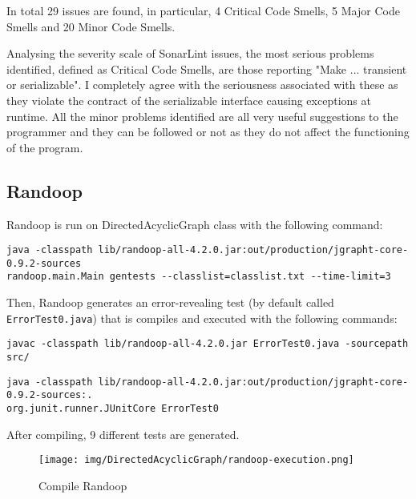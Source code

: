 \documentclass[a4paper,12pt]{article} %
\begin{document}
	In total 29 issues are found, in particular, 4 Critical Code Smells, 5 Major Code Smells and 20 Minor Code Smells.
	
	Analysing  the severity scale of SonarLint issues, the most serious problems identified, defined as Critical Code Smells, are those reporting "Make ... transient or serializable". I completely agree with the seriousness associated with these as they violate the contract of the serializable interface causing exceptions at runtime.
	All the minor problems identified are all very useful suggestions to the programmer and they can be followed or not as they do not affect the functioning of the program.
		
	\subsection*{Randoop}
	
	Randoop is run on DirectedAcyclicGraph class with the following command:
	
	\begin{lstlisting}[style=DOS,caption={Randoop Execution}, captionpos=b]
java -classpath lib/randoop-all-4.2.0.jar:out/production/jgrapht-core-0.9.2-sources 
randoop.main.Main gentests --classlist=classlist.txt --time-limit=3
	\end{lstlisting}
	
	Then, Randoop generates an error-revealing test (by default called \\ \texttt{ErrorTest0.java}) that is compiles and executed with the following commands:
	\begin{lstlisting}[style=DOS,caption={Compile Error Revealing Test}, captionpos=b]
javac -classpath lib/randoop-all-4.2.0.jar ErrorTest0.java -sourcepath src/
	\end{lstlisting}
	
	\begin{lstlisting}[style=DOS,caption={Execute Error Revealing Test}, captionpos=b]
java -classpath lib/randoop-all-4.2.0.jar:out/production/jgrapht-core-0.9.2-sources:. 
org.junit.runner.JUnitCore ErrorTest0
	\end{lstlisting}	
	
	After compiling, 9 different tests are generated.
	\begin{figure}[H]
		\centering
		\texttt{[image: img/DirectedAcyclicGraph/randoop-execution.png]}
		\caption{Compile Randoop}
		\label{fig:randexe-graph}
	\end{figure}
\end{document}
